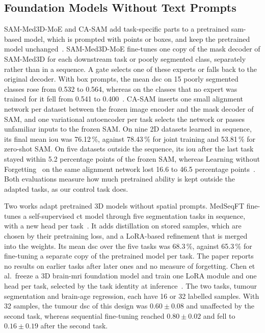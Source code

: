 \subsection{Foundation Models Without Text Prompts}
\label{subsec:cl-medseg-fm}

SAM-Med3D-MoE and CA-SAM add task-specific parts to a pretrained \gls{sam}-based model, which is prompted with points or boxes, and keep the pretrained model unchanged~\cite{wang2024sammed3dmoe,wang2025casam}.
SAM-Med3D-MoE fine-tunes one copy of the mask decoder of SAM-Med3D for each downstream task or poorly segmented class, separately rather than in a sequence.
A gate selects one of these experts or falls back to the original decoder.
With box prompts, the mean \gls{dsc} on 15 poorly segmented classes rose from 0.532 to 0.564, whereas on the classes that no expert was trained for it fell from 0.541 to 0.400~\cite[Table~1]{wang2024sammed3dmoe}.
CA-SAM inserts one small alignment network per dataset between the frozen image encoder and the mask decoder of SAM, and one variational autoencoder per task selects the network or passes unfamiliar inputs to the frozen SAM.
On nine 2D datasets learned in sequence, its final mean \gls{iou} was 76.12\,\%, against 78.43\,\% for joint training and 53.81\,\% for zero-shot SAM.
On five datasets outside the sequence, its \gls{iou} after the last task stayed within 5.2 percentage points of the frozen SAM, whereas Learning without Forgetting~\cite{li2017learningforgetting} on the same alignment network lost 16.6 to 46.5 percentage points~\cite[Table~2]{wang2025casam}.
Both evaluations measure how much pretrained ability is kept outside the adapted tasks, as our control task does.

Two works adapt pretrained 3D models without spatial prompts.
MedSeqFT fine-tunes a self-supervised \gls{ct} model through five segmentation tasks in sequence, with a new head per task~\cite{ye2025medseqft}.
It adds distillation on stored samples, which are chosen by their pretraining loss, and a LoRA-based refinement that is merged into the weights.
Its mean \gls{dsc} over the five tasks was 68.3\,\%, against 65.3\,\% for fine-tuning a separate copy of the pretrained model per task.
The paper reports no results on earlier tasks after later ones and no measure of forgetting.
Chen et al.\ freeze a 3D brain-\gls{mri} foundation model and train one LoRA module and one head per task, selected by the task identity at inference~\cite{chen2026fewshotcontinuallearning3d}.
The two tasks, tumour segmentation and brain-age regression, each have 16 or 32 labelled samples.
With 32 samples, the tumour \gls{dsc} of this design was $0.60 \pm 0.08$ and unaffected by the second task, whereas sequential fine-tuning reached $0.80 \pm 0.02$ and fell to $0.16 \pm 0.19$ after the second task.

